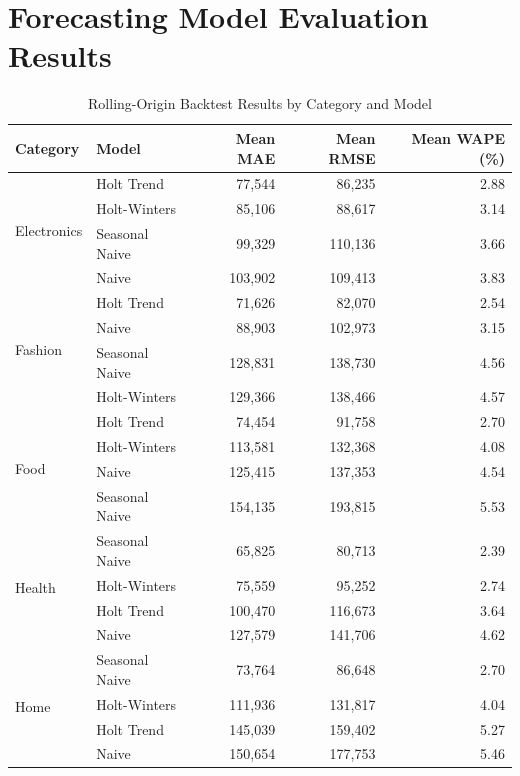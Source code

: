 \documentclass[11pt,a4paper]{article}
\begin{document}
\section{Forecasting Model Evaluation Results}

\begin{table}[H]
\centering
\caption{Rolling-Origin Backtest Results by Category and Model}
\label{tab:backtest}
\small
\begin{tabular}{@{}llrrr@{}}
\toprule
\textbf{Category} & \textbf{Model} & \textbf{Mean MAE} & \textbf{Mean RMSE} & \textbf{Mean WAPE (\%)} \\
\midrule
\multirow{4}{*}{Electronics} & Holt Trend & 77,544 & 86,235 & 2.88 \\
 & Holt-Winters & 85,106 & 88,617 & 3.14 \\
 & Seasonal Naive & 99,329 & 110,136 & 3.66 \\
 & Naive & 103,902 & 109,413 & 3.83 \\
\midrule
\multirow{4}{*}{Fashion} & Holt Trend & 71,626 & 82,070 & 2.54 \\
 & Naive & 88,903 & 102,973 & 3.15 \\
 & Seasonal Naive & 128,831 & 138,730 & 4.56 \\
 & Holt-Winters & 129,366 & 138,466 & 4.57 \\
\midrule
\multirow{4}{*}{Food} & Holt Trend & 74,454 & 91,758 & 2.70 \\
 & Holt-Winters & 113,581 & 132,368 & 4.08 \\
 & Naive & 125,415 & 137,353 & 4.54 \\
 & Seasonal Naive & 154,135 & 193,815 & 5.53 \\
\midrule
\multirow{4}{*}{Health} & Seasonal Naive & 65,825 & 80,713 & 2.39 \\
 & Holt-Winters & 75,559 & 95,252 & 2.74 \\
 & Holt Trend & 100,470 & 116,673 & 3.64 \\
 & Naive & 127,579 & 141,706 & 4.62 \\
\midrule
\multirow{4}{*}{Home} & Seasonal Naive & 73,764 & 86,648 & 2.70 \\
 & Holt-Winters & 111,936 & 131,817 & 4.04 \\
 & Holt Trend & 145,039 & 159,402 & 5.27 \\
 & Naive & 150,654 & 177,753 & 5.46 \\
\bottomrule
\end{tabular}
\end{table}
\end{document}
